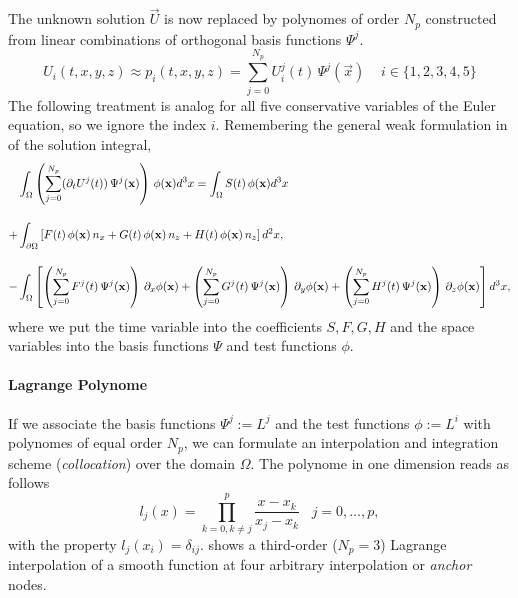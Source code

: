 The unknown solution $\vec{U}$ is now replaced by polynomes of order $N_p$
constructed from linear combinations of orthogonal basis functions
$\Psi^j$.
\begin{equation}
    U_{i}(t,x,y,z) \approx p_{i}(t,x,y,z) = \sum^{N_p}_{j=0} U^{j}_{i}(t) \, \Psi^j(\vec{x}) \;\;\;\; i \in \{1,2,3,4,5\}
\end{equation}
The following treatment is analog for all five conservative variables of the
Euler equation, so we ignore the index $i$. Remembering the general weak
formulation in  of the solution integral,
\begin{align}
\label{eqn:weak-formulation-galerkin}
    &\int_\Omega \left(\sum^{N_p}_{j=0} (\partial_t U^j(t)) \, \Psi^j(\vec{x})\right)\,\phi(\vec{x}) d^3x 
        = \int_\Omega S(t) \, \phi(\vec{x}) d^3x \nonumber \br
        +&\int_{\partial\Omega} \left[F(t)\,\phi(\vec{x})\,n_x + G(t)\,\phi(\vec{x})\,n_z + H(t)\,\phi(\vec{x})\,n_z \right] d^2x, \br
        -&\int_\Omega \left[
              \left(\sum^{N_p}_{j=0} F^j(t)\,\Psi^j(\vec{x})\right)\,\partial_x \phi(\vec{x}) 
            + \left(\sum^{N_p}_{j=0} G^j(t)\,\Psi^j(\vec{x})\right)\,\partial_y \phi(\vec{x})
            + \left(\sum^{N_p}_{j=0} H^j(t)\,\Psi^j(\vec{x})\right)\,\partial_z \phi(\vec{x}) \right] d^3x, \nonumber
\end{align}
where we put the time variable into the coefficients $S,F,G,H$ and the space
variables into the basis functions $\Psi$ and test functions $\phi$.

\paragraph{Lagrange Polynome}
If we associate the basis functions $\Psi^{j} := L^{j}$ and the
test functions $\phi := L^{i}$ with  polynomes of equal
order $N_p$, we can formulate an interpolation and integration scheme
(\emph{collocation}) over the domain $\Omega$. The polynome in one dimension
reads as follows
\begin{equation}
l_j(x) = \prod^p_{k=0,k\neq j} \frac{x-x_k}{x_j-x_k} \;\;\; j = 0,\dots,p,
\end{equation}
with the  property $l_j(x_i) = \delta_{ij}$.
 shows a third-order ($N_p = 3$)
Lagrange interpolation of a smooth function at four arbitrary
interpolation or \emph{anchor} nodes.

